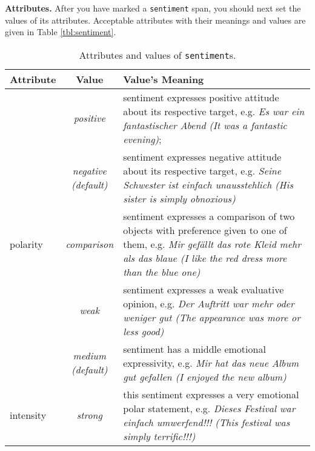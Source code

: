 \documentclass[11pt,a4paper]{article}
\newlength{\clmnwidth}
\theoremstyle{mytheoremstyle}
\begin{document}
\noindent\textbf{Attributes.} After you have marked a \texttt{sentiment} span,
you should next set the values of its attributes.  Acceptable attributes with
their meanings and values are given in Table \ref{tbl:sentiment}.
\begin{center}
  \begin{table}[ht]
    \caption{Attributes and values of \texttt{sentiment}s.}
    \begin{tabular}{|l|c|p{\clmnwidth}|}\hline
      Attribute & Value & Value's Meaning\\\hline

      & \textit{positive} & sentiment expresses positive attitude about
      its respective target, e.g. \textit{Es war ein fantastischer Abend
        (It was a fantastic evening)};\\\cline{2-3}

      & \textit{negative\newline(default)} & sentiment expresses
      negative attitude about its respective target, e.g. \textit{Seine
        Schwester ist einfach unausstehlich (His sister is simply
        obnoxious)}\\\cline{2-3}

      \multirow{-3}{*}{polarity} & \textit{comparison} & sentiment
      expresses a comparison of two objects with preference given to one
      of them, e.g. \textit{Mir gef\"allt das rote Kleid mehr als das
        blaue (I like the red dress more than the blue one)}\\\hline


      & \textit{weak} & sentiment expresses a weak evaluative opinion,
      e.g. \textit{Der Auftritt war mehr oder weniger gut (The
        appearance was more or less good)}\\\cline{2-3}

      & \textit{medium\newline(default)} & sentiment has a middle
      emotional expressivity, e.g. \textit{Mir hat das neue Album gut
        gefallen (I enjoyed the new album)}\\\cline{2-3}

      \multirow{-3}{*}{intensity} & \textit{strong} & this sentiment
      expresses a very emotional polar statement, e.g. \textit{Dieses
        Festival war einfach umwerfend!!! (This festival was simply
        terrific!!!)}\\\hline


\end{tabular}
\end{table}
\end{center}
\end{document}
